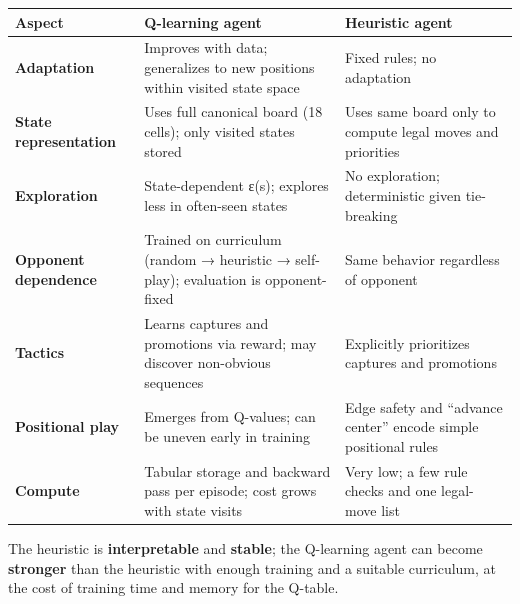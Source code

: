 \documentclass[
]{article}
\newcounter{none} %
\begin{document}
{\def\LTcaptype{none} %
\begin{longtable}[]{@{}
  >{\raggedright\arraybackslash}p{}
  >{\raggedright\arraybackslash}p{}
  >{\raggedright\arraybackslash}p{}@{}}
\toprule\noalign{}
\begin{minipage}[b]{\linewidth}\raggedright
Aspect
\end{minipage} & \begin{minipage}[b]{\linewidth}\raggedright
Q-learning agent
\end{minipage} & \begin{minipage}[b]{\linewidth}\raggedright
Heuristic agent
\end{minipage} \\
\midrule\noalign{}
\endhead
\bottomrule\noalign{}
\endlastfoot
\textbf{Adaptation} & Improves with data; generalizes to new positions
within visited state space & Fixed rules; no adaptation \\
\textbf{State representation} & Uses full canonical board (18 cells);
only visited states stored & Uses same board only to compute legal moves
and priorities \\
\textbf{Exploration} & State-dependent ε(s); explores less in often-seen
states & No exploration; deterministic given tie-breaking \\
\textbf{Opponent dependence} & Trained on curriculum (random → heuristic
→ self-play); evaluation is opponent-fixed & Same behavior regardless of
opponent \\
\textbf{Tactics} & Learns captures and promotions via reward; may
discover non-obvious sequences & Explicitly prioritizes captures and
promotions \\
\textbf{Positional play} & Emerges from Q-values; can be uneven early in
training & Edge safety and ``advance center'' encode simple positional
rules \\
\textbf{Compute} & Tabular storage and backward pass per episode; cost
grows with state visits & Very low; a few rule checks and one legal-move
list \\
\end{longtable}
}

The heuristic is \textbf{interpretable} and \textbf{stable}; the
Q-learning agent can become \textbf{stronger} than the heuristic with
enough training and a suitable curriculum, at the cost of training time
and memory for the Q-table.
\end{document}
